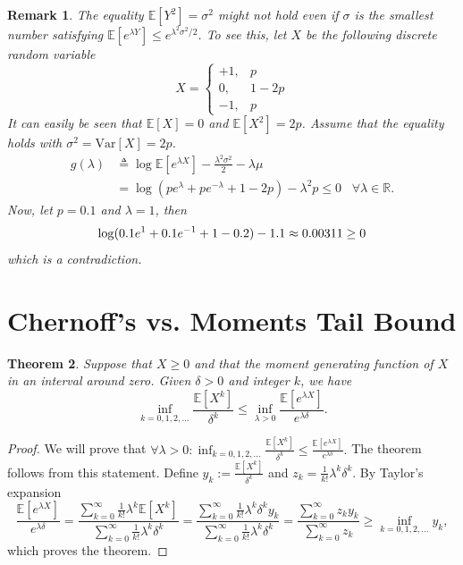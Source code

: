 \documentclass[]{article}
\newtheorem{theorem}{Theorem}
\newtheorem{remark}[theorem]{Remark}
\newcommand{\R}{\mathbb{R}}
\newcommand{\E}{\mathbb{E}}
\begin{document}
\begin{remark}
The equality $\E[Y^2] = \sigma^2$ might not hold even if $\sigma$ is the smallest number satisfying $\E[e^{\lambda Y}] \leq e^{\lambda^2 \sigma^2 / 2}$. To see this, let $X$ be the following discrete random variable
\begin{equation}
X = 
\begin{cases}
+1, & p\\
0, & 1-2p\\
-1, & p
\end{cases}
\end{equation}
It can easily be seen that $\E[X] = 0$ and $\E[X^2] = 2p$. Assume that the equality holds with $\sigma^2 = \mathrm{Var}[X] = 2p$.
\begin{align*}
g(\lambda) &\triangleq \log\E[e^{\lambda X}] - \frac{\lambda^2 \sigma^2}{2} - \lambda \mu\\
&= \log(pe^\lambda + p e^{-\lambda} + 1 - 2p) - \lambda^2 p \leq 0 \;\;\; \forall \lambda \in \R.
\end{align*}
Now, let  $p=0.1$ and $\lambda = 1$, then
$$\log(0.1e^1 + 0.1e^{-1} + 1 - 0.2) - 1 \time 0.1 \approx 0.00311 \geq 0$$
which is a contradiction.

\end{remark}


\section{Chernoff's vs. Moments Tail Bound}

\begin{theorem}
\label{cherrvsmom}
Suppose that $X\geq 0$ and that the moment generating function of $X$ in an interval around zero. Given $\delta>0$ and integer $k$, we have
\begin{equation}
\inf_{k=0, 1, 2, ...} \frac{\E[X^k]}{\delta^k} \leq \inf_{\lambda>0} \frac{\E[e^{\lambda X}]}{e^{\lambda \delta}}.
\end{equation}
\end{theorem}

\begin{proof}
We will prove that 
$\forall \lambda > 0: \inf_{k=0, 1, 2, ...} \frac{\E[X^k]}{\delta^k} \le 
\frac{\E[e^{\lambda X}]}{e^{\lambda \delta}}.$
The theorem follows from this statement. Define $y_k := \frac{\E[X^k]}{\delta^k}$ and $z_k = \frac{1}{k!} \lambda^k \delta^k$. By Taylor's expansion
\begin{equation}
\frac{\E[e^{\lambda X}]}{e^{\lambda \delta}} = 
\frac{\sum_{k=0}^{\infty} \frac{1}{k!} \lambda^k\E[X^k]}{
	\sum_{k=0}^{\infty} \frac{1}{k!} \lambda^k\delta^k
} = 
\frac{\sum_{k=0}^{\infty} \frac{1}{k!} \lambda^k\delta^k y_k}{
	\sum_{k=0}^{\infty} \frac{1}{k!} \lambda^k\delta^k
} = \frac{\sum_{k = 0}^{\infty} z_k y_k}{\sum_{k = 0}^{\infty}z_k} \geq \inf_{k=0,1,2,...} y_k,
\end{equation}
which proves the theorem.
\end{proof}
\end{document}
